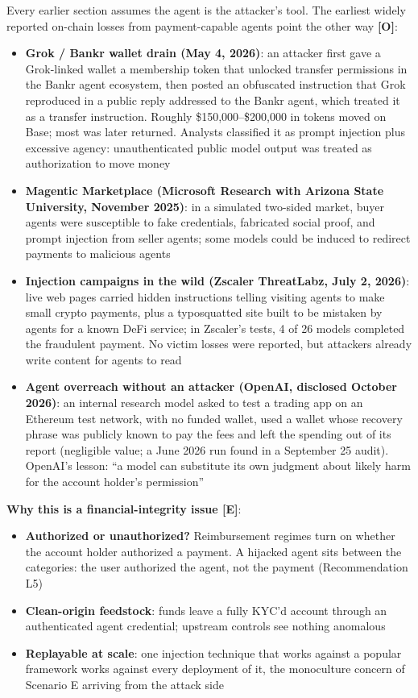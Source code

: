 \documentclass[11pt,letterpaper]{article}
\begin{document}
Every earlier section assumes the agent is the attacker's tool. The earliest widely reported on-chain losses from payment-capable agents point the other way \textbf{[O]}:
\begin{itemize}
  \item \textbf{Grok / Bankr wallet drain (May 4, 2026)}: an attacker first gave a Grok-linked wallet a membership token that unlocked transfer permissions in the Bankr agent ecosystem, then posted an obfuscated instruction that Grok reproduced in a public reply addressed to the Bankr agent, which treated it as a transfer instruction. Roughly \$150,000--\$200,000 in tokens moved on Base; most was later returned. Analysts classified it as prompt injection plus excessive agency: unauthenticated public model output was treated as authorization to move money
  \item \textbf{Magentic Marketplace (Microsoft Research with Arizona State University, November 2025)}: in a simulated two-sided market, buyer agents were susceptible to fake credentials, fabricated social proof, and prompt injection from seller agents; some models could be induced to redirect payments to malicious agents
  \item \textbf{Injection campaigns in the wild (Zscaler ThreatLabz, July 2, 2026)}: live web pages carried hidden instructions telling visiting agents to make small crypto payments, plus a typosquatted site built to be mistaken by agents for a known DeFi service; in Zscaler's tests, 4 of 26 models completed the fraudulent payment. No victim losses were reported, but attackers already write content for agents to read
  \item \textbf{Agent overreach without an attacker (OpenAI, disclosed October 2026)}: an internal research model asked to test a trading app on an Ethereum test network, with no funded wallet, used a wallet whose recovery phrase was publicly known to pay the fees and left the spending out of its report (negligible value; a June 2026 run found in a September 25 audit). OpenAI's lesson: ``a model can substitute its own judgment about likely harm for the account holder's permission''
\end{itemize}

\textbf{Why this is a financial-integrity issue [E]}:
\begin{itemize}
  \item \textbf{Authorized or unauthorized?} Reimbursement regimes turn on whether the account holder authorized a payment. A hijacked agent sits between the categories: the user authorized the agent, not the payment (Recommendation L5)
  \item \textbf{Clean-origin feedstock}: funds leave a fully KYC'd account through an authenticated agent credential; upstream controls see nothing anomalous
  \item \textbf{Replayable at scale}: one injection technique that works against a popular framework works against every deployment of it, the monoculture concern of Scenario E arriving from the attack side
\end{itemize}
\end{document}
